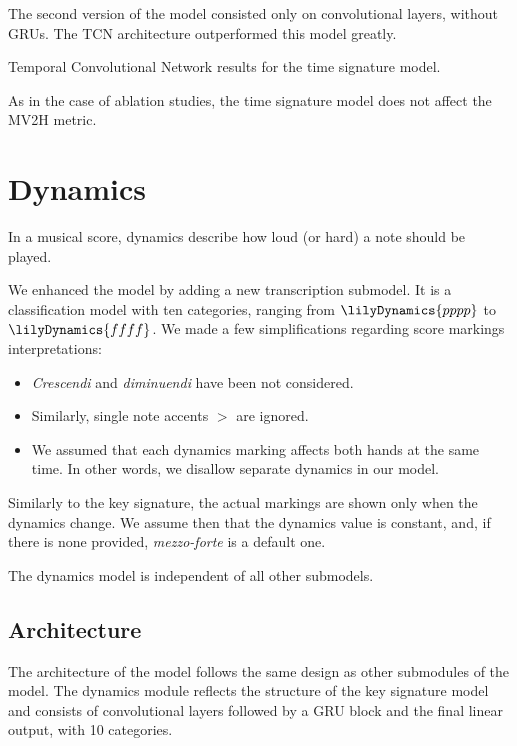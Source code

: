 The second version of the model consisted only on convolutional layers, without GRUs. The TCN architecture outperformed this model greatly.

\begin{table}[ht!]
\centering

\caption[Temporal Convolutional Network results for the time signature model.]{Temporal Convolutional Network results for the time signature model.}
\label{time_signature_tcn}
\end{table}

As in the case of ablation studies, the time signature model does not affect the MV2H metric.

\section{Dynamics}

In a musical score, dynamics describe how loud (or hard) a note should be played. 

We enhanced the model by adding a new transcription submodel. It is a classification model with ten categories, ranging from $\lilyDynamics{pppp}$ to $\lilyDynamics{ffff}$. We made a few simplifications regarding score markings interpretations: \begin{itemize}
	\item \emph{Crescendi} and \emph{diminuendi} have been not considered.
	\item Similarly, single note accents $>$ are ignored.
	\item We assumed that each dynamics marking affects both hands at the same time. In other words, we disallow separate dynamics in our model.
\end{itemize}

Similarly to the key signature, the actual markings are shown only when the dynamics change. We assume then that the dynamics value is constant, and, if there is none provided, \emph{mezzo-forte} is a default one.

The dynamics model is independent of all other submodels.

\subsection{Architecture}

The architecture of the model follows the same design as other submodules of the model. The dynamics module reflects the structure of the key signature model and consists of convolutional layers followed by a GRU block and the final linear output, with 10 categories.

